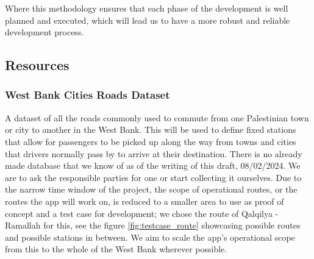 \documentclass[a4paper, 12pt]{article} %
\begin{document}
            Where this methodology ensures that each phase of the development is well planned and executed, which will lead us to have a more robust and reliable development process.

        \subsection{Resources}
            \subsubsection{West Bank Cities Roads Dataset}
                A dataset of all the roads commonly used to commute from one Palestinian town or city to another in the West Bank. This will be used to define fixed stations that allow for passengers to be picked up along the way from towns and cities that drivers normally pass by to arrive at their destination. There is no already made database that we know of as of the writing of this draft, 08/02/2024. We are to ask the responsible parties for one or start collecting it ourselves. Due to the narrow time window of the project, the scope of operational routes, or the routes the app will work on, is reduced to a smaller area to use as proof of concept and a test case for development; we chose the route of Qalqilya - Ramallah for this, see the figure \ref{fig:testcase_route} showcasing possible routes and possible stations in between. We aim to scale the app's operational scope from this to the whole of the West Bank wherever possible.
                
\end{document}
